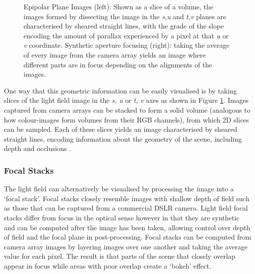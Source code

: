 \begin{figure}[tbp]
    \caption[Epipolar plane images and synthetic aperture focus]{Epipolar Plane Images (left): Shown as a slice of a volume, the images formed by dissecting the image in the \textit{s,u} and \textit{t,v} planes are characterised by sheared straight lines, with the grade of the slope encoding the amount of parallax experienced by a pixel at that \textit{u} or \textit{v} coordinate. Synthetic aperture focusing (right): taking the average of every image from the camera array yields an image where different parts are in focus depending on the alignments of the images.}
    \label{epiplaneimg}
\end{figure}


One way that this geometric information can be easily visualised is by taking slices of the light field image in the \textit{s, u} or \textit{t, v} axes as shown in Figure \ref{epiplaneimg}. Images captured from camera arrays can be stacked to form a solid volume (analogous to how colour-images form volumes from their RGB channels), from which 2D slices can be sampled. Each of these slices yields an image characterised by sheared straight lines, encoding information about the geometry of the scene, including depth and occlusions \cite{bolles1987epiplane}. 


\subsubsection{Focal Stacks}
The light field can alternatively be visualised by processing the image into a `focal stack'. Focal stacks closely resemble images with shallow depth of field such as those that can be captured from a commercial DSLR camera. Light field focal stacks differ from focus in the optical sense however in that they are synthetic and can be computed after the image has been taken, allowing control over depth of field and the focal plane in post-processing. Focal stacks can be computed from camera array images by layering images over one another and taking the average value for each pixel. The result is that parts of the scene that closely overlap appear in focus while areas with poor overlap create a `bokeh' effect. 


